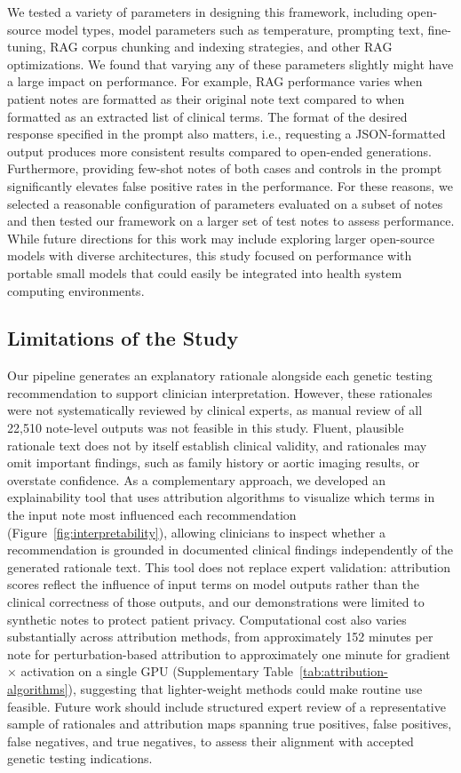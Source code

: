 \documentclass[fleqn,10pt]{wlscirep}
\begin{document}
We tested a variety of parameters in designing this framework, including open-source model types, model parameters such as temperature, prompting text, fine-tuning, RAG corpus chunking and indexing strategies, and other RAG optimizations. We found that varying any of these parameters slightly might have a large impact on performance. For example, RAG performance varies when patient notes are formatted as their original note text compared to when formatted as an extracted list of clinical terms. The format of the desired response specified in the prompt also matters, i.e., requesting a JSON-formatted output produces more consistent results compared to open-ended generations. Furthermore, providing few-shot notes of both cases and controls in the prompt significantly elevates false positive rates in the performance. For these reasons, we selected a reasonable configuration of parameters evaluated on a subset of notes and then tested our framework on a larger set of test notes to assess performance. While future directions for this work may include exploring larger open-source models with diverse architectures, this study focused on performance with portable small models that could easily be integrated into health system computing environments. 

\subsection*{Limitations of the Study}
Our pipeline generates an explanatory rationale alongside each genetic testing recommendation to support clinician interpretation. However, these rationales were not systematically reviewed by clinical experts, as manual review of all 22,510 note-level outputs was not feasible in this study. Fluent, plausible rationale text does not by itself establish clinical validity, and rationales may omit important findings, such as family history or aortic imaging results, or overstate confidence. As a complementary approach, we developed an explainability tool that uses attribution algorithms to visualize which terms in the input note most influenced each recommendation (Figure~\ref{fig:interpretability}), allowing clinicians to inspect whether a recommendation is grounded in documented clinical findings independently of the generated rationale text. This tool does not replace expert validation: attribution scores reflect the influence of input terms on model outputs rather than the clinical correctness of those outputs, and our demonstrations were limited to synthetic notes to protect patient privacy. Computational cost also varies substantially across attribution methods, from approximately 152 minutes per note for perturbation-based attribution to approximately one minute for gradient $\times$ activation on a single GPU (Supplementary Table~\ref{tab:attribution-algorithms}), suggesting that lighter-weight methods could make routine use feasible. Future work should include structured expert review of a representative sample of rationales and attribution maps spanning true positives, false positives, false negatives, and true negatives, to assess their alignment with accepted genetic testing indications.
\end{document}
